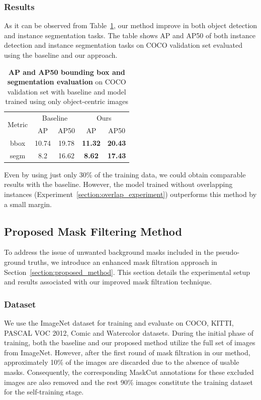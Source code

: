 \subsubsection{Results}
As it can be observed from Table~\ref{tab:object-centric-analysis}, our method improve in both object detection and instance segmentation tasks. The table shows AP and AP50 of both instance detection and instance segmentation tasks on COCO validation set evaluated using the baseline and our approach.
\begin{table}[htbp]
	\centering
	\begin{tabular}{c|cc|cc}
		\toprule
		\multirow{2}{*}{Metric} & \multicolumn{2}{c|}{Baseline} & \multicolumn{2}{c}{Ours} \\ \cmidrule{2-5}
		& AP & AP50 & AP & AP50 \\ \midrule
		bbox & 10.74 & 19.78 & \textbf{11.32} & \textbf{20.43} \\
		\midrule
		segm & 8.2 & 16.62 & \textbf{8.62} & \textbf{17.43} \\
		\bottomrule
	\end{tabular}
	\caption[\textbf{Evaluation of baseline vs Model Trained with Only Object-Centric Images}]{\textbf{AP and AP50 bounding box and segmentation evaluation} on COCO validation set with baseline and model trained using only object-centric images}
	\label{tab:object-centric-analysis}
\end{table}
Even by using just only 30\% of the training data, we could obtain comparable results with the baseline. However, the model trained without overlapping instances (Experiment~\ref{section:overlap_experiment}) outperforms this method by a small margin.

\subsection{Proposed Mask Filtering Method}
\label{section:mask_refinement_experiment}
To address the issue of unwanted background masks included in the pseudo-ground truths, we introduce an enhanced mask filtration approach in Section~\ref{section:proposed_method}. This section details the experimental setup and results associated with our improved mask filtration technique.

\subsubsection{Dataset}
We use the ImageNet dataset for training and evaluate on COCO, KITTI, PASCAL VOC 2012, Comic and Watercolor datasets. During the initial phase of training, both the baseline and our proposed method utilize the full set of images from ImageNet. However, after the first round of mask filtration in our method, approximately 10\% of the images are discarded due to the absence of usable masks. Consequently, the corresponding MaskCut annotations for these excluded images are also removed and the rest 90\% images constitute the training dataset for the self-training stage.

